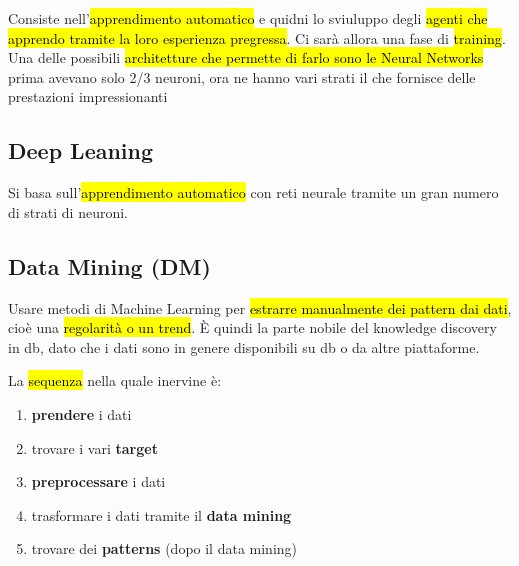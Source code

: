 Consiste nell'\hl{apprendimento automatico} e quidni lo sviuluppo degli \hl{agenti che apprendo tramite la loro esperienza pregressa}. Ci sarà allora una fase di \hl{training}.
Una delle possibili \hl{architetture che permette di farlo sono le Neural Networks} prima avevano solo 2/3 neuroni, ora ne hanno vari strati il che fornisce delle prestazioni impressionanti


\subsection{Deep Leaning}

Si basa sull'\hl{apprendimento automatico} con reti neurale tramite un gran numero di strati di neuroni.


\subsection{Data Mining (DM)}

Usare metodi di Machine Learning per \hl{estrarre manualmente dei pattern dai dati}, cioè una \hl{regolarità o un trend}. È quindi la parte nobile del knowledge discovery in db, dato che i dati sono in genere disponibili su db o da altre piattaforme.

La \hl{sequenza} nella quale inervine è:
\begin{enumerate}
	\item \textbf{prendere} i dati
	\item trovare i vari \textbf{target}
	\item \textbf{preprocessare} i dati
	\item trasformare i dati tramite il \textbf{data mining}
	\item trovare dei \textbf{patterns} (dopo il data mining)
\end{enumerate}


































